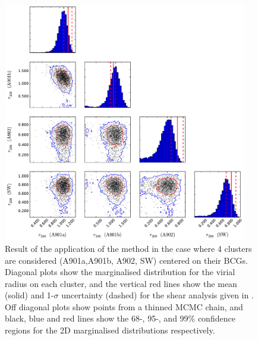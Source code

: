 \documentclass[useAMS,usenatbib,times,letter,amssymb]{mn2e}
\begin{document}
\begin{figure}
\centering
\includegraphics[width = 0.95\textwidth]{Figures/Data/Mass_Reconstruction/MCMC_DistributionPlot_4Cluster_BCG_MassOnly.pdf}
\caption{Result of the application of the method in the case where 4 clusters are considered (A901a,A901b, A902, SW) centered on their BCGs. Diagonal plots show the marginalised distribution for the virial radius on each cluster, and the vertical red lines show the mean (solid) and 1-$\sigma$ uncertainty (dashed) for the shear analysis given in \cite{Heymans:2008p2060}. Off diagonal plots show points from a thinned MCMC chain, and black, blue and red lines show the 68-, 95-, and 99\% confidence regions for the 2D marginalised distributions respectively.} \label{fig:MassRecon_BCG_4Cluster}
\end{figure}
\end{document}
